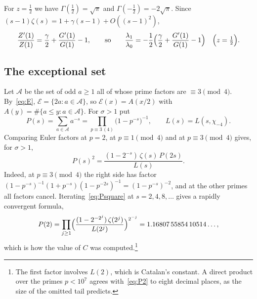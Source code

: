 \documentclass[11pt]{article}
\theoremstyle{definition}
\newcommand{\E}{\mathcal{E}}
\begin{document}
For $z=\tfrac12$ we have $\Gamma(\tfrac12)=\sqrt\pi$ and $\Gamma(-\tfrac12)=-2\sqrt\pi$. Since $(s-1)\zeta(s)=1+\gamma(s-1)+O((s-1)^2)$,
\begin{equation}\label{eq:Zprime}
  \frac{Z'(1)}{Z(1)}=\frac{\gamma}{2}+\frac{G'(1)}{G(1)}-1,
  \qquad\text{so}\qquad
  \frac{\lambda_1}{\lambda_0}=-\frac12\Bigl(\frac{\gamma}{2}+\frac{G'(1)}{G(1)}-1\Bigr)\quad\Bigl(z=\tfrac12\Bigr).
\end{equation}

\subsection{The exceptional set}

Let $\mathcal A$ be the set of odd $a\ge1$ all of whose prime factors are $\equiv3\pmod4$. By~\eqref{eq:E}, $\E=\{2a:a\in\mathcal A\}$, so $\E(x)=A(x/2)$ with $A(y)=\#\{a\le y:a\in\mathcal A\}$. For $\sigma>1$ put
\[
  P(s)=\sum_{a\in\mathcal A}a^{-s}=\prod_{p\equiv3\,(4)}\bigl(1-p^{-s}\bigr)^{-1},\qquad L(s)=L(s,\chi_{-4}).
\]
Comparing Euler factors at $p=2$, at $p\equiv1\pmod4$ and at $p\equiv3\pmod4$ gives, for $\sigma>1$,
\begin{equation}\label{eq:Psquare}
  P(s)^2=\frac{(1-2^{-s})\,\zeta(s)\,P(2s)}{L(s)} .
\end{equation}
Indeed, at $p\equiv3\pmod4$ the right side has factor $(1-p^{-s})^{-1}(1+p^{-s})(1-p^{-2s})^{-1}=(1-p^{-s})^{-2}$, and at the other primes all factors cancel. Iterating~\eqref{eq:Psquare} at $s=2,4,8,\dots$ gives a rapidly convergent formula,
\begin{equation}\label{eq:P2}
  P(2)=\prod_{j\ge1}\Bigl(\frac{(1-2^{-2^j})\,\zeta(2^j)}{L(2^j)}\Bigr)^{2^{-j}}=1.16807\,55854\,10514\ldots,
\end{equation}
which is how the value of $C$ was computed.\footnote{The first factor involves $L(2)$, which is Catalan's constant. A direct product over the primes $p<10^7$ agrees with~\eqref{eq:P2} to eight decimal places, as the size of the omitted tail predicts.}
\end{document}

